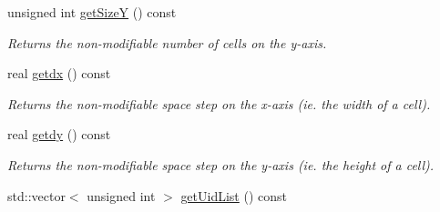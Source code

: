 \begin{DoxyCompactItemize}
unsigned int \hyperlink{classDomain_a0e7519f6560ddaea2c7c84785441da9a}{getSizeY} () const 
\begin{DoxyCompactList}\small\item\em Returns the non-\/modifiable number of cells on the y-\/axis. \item\end{DoxyCompactList}\item 
real \hyperlink{classDomain_acdf83ef9d3dad3bbc1ae3101f4b2e323}{getdx} () const 
\begin{DoxyCompactList}\small\item\em Returns the non-\/modifiable space step on the x-\/axis (ie. the width of a cell). \item\end{DoxyCompactList}\item 
real \hyperlink{classDomain_a5d72188d7c1873c08da8ef387dee33c6}{getdy} () const 
\begin{DoxyCompactList}\small\item\em Returns the non-\/modifiable space step on the y-\/axis (ie. the height of a cell). \item\end{DoxyCompactList}\item 
\hypertarget{classDomain_a6f8a520ffdec82aedbc075c64792517d}{
std::vector$<$ unsigned int $>$ \hyperlink{classDomain_a6f8a520ffdec82aedbc075c64792517d}{getUidList} () const }
\label{classDomain_a6f8a520ffdec82aedbc075c64792517d}


\end{DoxyCompactItemize}
